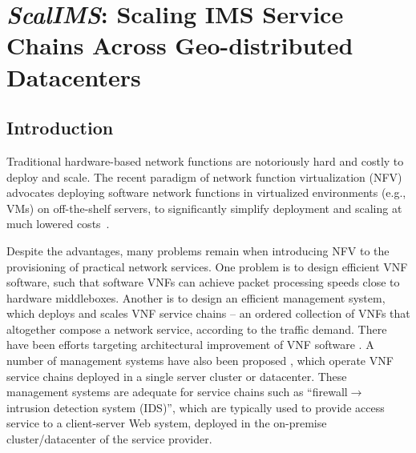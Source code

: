 \chapter {\textit{ScalIMS}: Scaling IMS Service Chains Across Geo-distributed Datacenters}
\label{ch:scalims}

\section{Introduction} \label{Introduction}

Traditional hardware-based network functions are notoriously hard and costly to deploy and scale. The recent paradigm of network function virtualization (NFV) advocates deploying software network functions in virtualized environments (e.g., VMs) on off-the-shelf servers, to significantly simplify deployment and scaling at much lowered costs~\cite{nfv-website}.

Despite the advantages, many problems remain when introducing NFV to the provisioning of practical network services. %
 One problem is to design efficient VNF software, such that software VNFs can achieve packet processing speeds close to hardware middleboxes. Another is to design an efficient management system, which deploys and scales VNF service chains -- an ordered collection of VNFs that altogether compose a network service, according to the traffic demand. There have been efforts targeting architectural improvement of VNF software \cite{martins2014clickos}. A number of management systems have also been proposed \cite{palkar2015e2, gember2012stratos}, which operate VNF service chains deployed in a single server cluster or datacenter. These management systems are adequate for service chains such as ``firewall$\rightarrow$ intrusion detection system (IDS)'', %
 which are typically used to provide access service to a client-server Web system, %
  deployed in the on-premise cluster/datacenter of the service provider.


